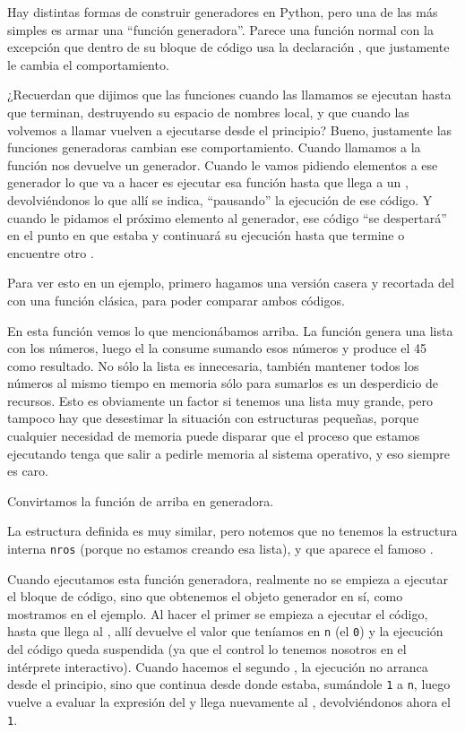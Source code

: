 Hay distintas formas de construir generadores en Python, pero una de las más simples es armar una ``función generadora''. Parece una función normal con la excepción que dentro de su bloque de código usa la declaración , que justamente le cambia el comportamiento.

¿Recuerdan que dijimos que las funciones cuando las llamamos se ejecutan hasta que terminan, destruyendo su espacio de nombres local, y que cuando las volvemos a llamar vuelven a ejecutarse desde el principio? Bueno, justamente las funciones generadoras cambian ese comportamiento. Cuando llamamos a la función nos devuelve un generador. Cuando le vamos pidiendo elementos a ese generador lo que va a hacer es ejecutar esa función hasta que llega a un , devolviéndonos lo que allí se indica, ``pausando'' la ejecución de ese código. Y cuando le pidamos el próximo elemento al generador, ese código ``se despertará'' en el punto en que estaba y continuará su ejecución hasta que termine o encuentre otro .

Para ver esto en un ejemplo, primero hagamos una versión casera y recortada del  con una función clásica, para poder comparar ambos códigos.


En esta función vemos lo que mencionábamos arriba. La función genera una lista con los números, luego el  la consume sumando esos números y produce el 45 como resultado. No sólo la lista es innecesaria, también mantener todos los números al mismo tiempo en memoria sólo para sumarlos es un desperdicio de recursos. Esto es obviamente un factor si tenemos una lista muy grande, pero tampoco hay que desestimar la situación con estructuras pequeñas, porque cualquier necesidad de memoria puede disparar que el proceso que estamos ejecutando tenga que salir a pedirle memoria al sistema operativo, y eso siempre es caro.

Convirtamos la función de arriba en generadora.


La estructura definida es muy similar, pero notemos que no tenemos la estructura interna \texttt{nros} (porque no estamos creando esa lista), y que aparece el famoso .

Cuando ejecutamos esta función generadora, realmente no se empieza a ejecutar el bloque de código, sino que obtenemos el objeto generador en sí, como mostramos en el ejemplo. Al hacer el primer  se empieza a ejecutar el código, hasta que llega al , allí devuelve el valor que teníamos en \verb|n| (el \verb|0|) y la ejecución del código queda suspendida (ya que el control lo tenemos nosotros en el intérprete interactivo). Cuando hacemos el segundo , la ejecución no arranca desde el principio, sino que continua desde donde estaba, sumándole \verb|1| a \verb|n|, luego vuelve a evaluar la expresión del  y llega nuevamente al , devolviéndonos ahora el \verb|1|. 

